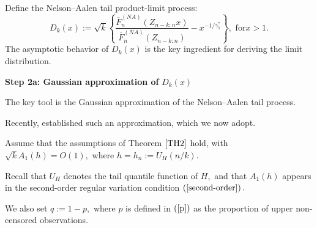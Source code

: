 \documentclass[reqno,openbib,runningheads,a4paper,12pt]{amsart}%
\begin{document}
\noindent Define the Nelson--Aalen tail product-limit process:%
\begin{equation}
D_{k}\left(  x\right)  :=\sqrt{k}\left\{  \frac{\overline{F}_{n}^{\left(
NA\right)  }\left(  Z_{n-k:n}x\right)  }{\overline{F}_{n}^{\left(  NA\right)
}\left(  Z_{n-k:n}\right)  }-x^{-1/\gamma_{1}^{\ast}}\right\}  ,\text{ for
}x>1. \label{D}%
\end{equation}
The asymptotic behavior of $D_{k}\left(  x\right)  $ is the key ingredient for
deriving the limit distribution.\textbf{\medskip}

\noindent\textbf{Step 2a: Gaussian approximation of }$D_{k}\left(  x\right)
$\textbf{\medskip}

\noindent The key tool is the Gaussian approximation of the Nelson--Aalen tail
process.\textbf{\medskip}

\noindent Recently, \cite{MNS2025} established such an approximation, which we
now adopt.\textbf{\medskip}

\noindent Assume that the assumptions of Theorem $\ref{TH2}$ hold, with
$\sqrt{k}A_{1}\left(  h\right)  =O\left(  1\right)  ,$ where $h=h_{n}%
:=U_{H}\left(  n/k\right)  .$\textbf{\medskip}

\noindent Recall that $U_{H}$ denotes the tail quantile function of $H,$ and
that $A_{1}\left(  h\right)  $ appears in the second-order regular variation
condition $\left(  \ref{second-order}\right)  .$\textbf{\medskip}

\noindent We also set $q:=1-p,$ where $p$ is defined in $\left(
\ref{p}\right)  $ as the proportion of upper non-censored observations.
\textbf{\medskip}
\end{document}
